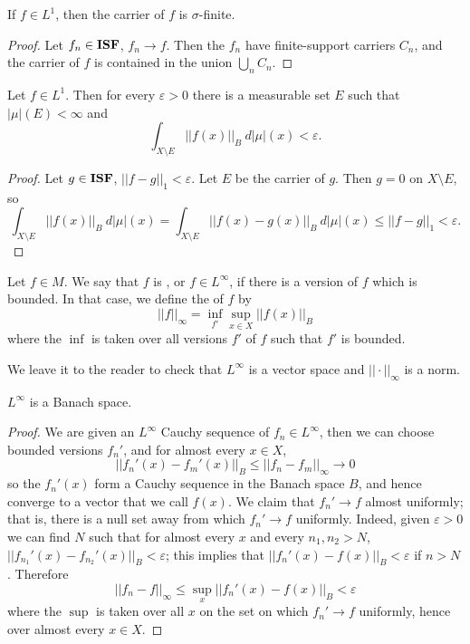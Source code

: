 \begin{lemma}
If $f \in L^{1}$, then the carrier of $f$ is $\sigma$-finite.
\end{lemma}
\begin{proof}
Let $f_{n} \in \mathbf{ISF}$, $f_{n} \to f$. Then the $f_{n}$ have finite-support carriers $C_{n}$, and the carrier of $f$ is contained in the union $\bigcup_{n} C_{n}$.
\end{proof}

\begin{lemma}\label{L1 functions almost have finite carrier}
Let $f \in L^{1}$. Then for every $\varepsilon > 0$ there is a measurable set $E$ such that $|\mu|(E) < \infty$ and
\[\int_{X \setminus E} ||f(x)||_{B} ~d|\mu|(x) < \varepsilon.\]
\end{lemma}
\begin{proof}
Let $g \in \mathbf{ISF}$, $||f - g||_{1} < \varepsilon$.
Let $E$ be the carrier of $g$. Then $g = 0$ on $X \setminus E$, so
\[\int_{X \setminus E} ||f(x)||_{B} ~d|\mu|(x) = \int_{X \setminus E} ||f(x) - g(x)||_{B} ~d|\mu|(x) \leq ||f - g||_{1} < \varepsilon.\]
\end{proof}

\begin{definition}
Let $f \in M$. We say that $f$ is , or $f \in L^{\infty}$, if there is a version of $f$ which is bounded.
In that case, we define the  of $f$ by
\[||f||_{\infty} = \inf_{f'} \sup_{x \in X} ||f(x)||_{B}\]
where the $\inf$ is taken over all versions $f'$ of $f$ such that $f'$ is bounded.
\end{definition}

\begin{subsec}
We leave it to the reader to check that $L^{\infty}$ is a vector space and $||\cdot||_{\infty}$ is a norm.
\end{subsec}

\begin{lemma}
$L^{\infty}$ is a Banach space.
\end{lemma}
\begin{proof}
We are given an $L^{\infty}$ Cauchy sequence of $f_{n} \in L^{\infty}$, then we can choose bounded versions $f_{n}'$, and for almost every $x \in X$,
\[||f_{n}'(x) - f_{m}'(x)||_{B} \leq ||f_{n} - f_{m}||_{\infty} \to 0\]
so the $f_{n}'(x)$ form a Cauchy sequence in the Banach space $B$, and hence converge to a vector that we call $f(x)$.
We claim that $f_{n}' \to f$ almost uniformly; that is, there is a null set away from which $f_{n}' \to f$ uniformly.
Indeed, given $\varepsilon > 0$ we can find $N$ such that for almost every $x$ and every $n_{1}, n_{2} > N$, $||f_{n_{1}}'(x) - f_{n_{2}}'(x)||_{B} < \varepsilon$; this implies that $||f_{n}'(x) - f(x)||_{B} < \varepsilon$ if $n > N$.
Therefore
\[||f_{n} - f||_{\infty} \leq \sup_{x} ||f_{n}'(x) - f(x)||_{B} < \varepsilon\]
where the $\sup$ is taken over all $x$ on the set on which $f_{n}' \to f$ uniformly, hence over almost every $x \in X$.
\end{proof}

